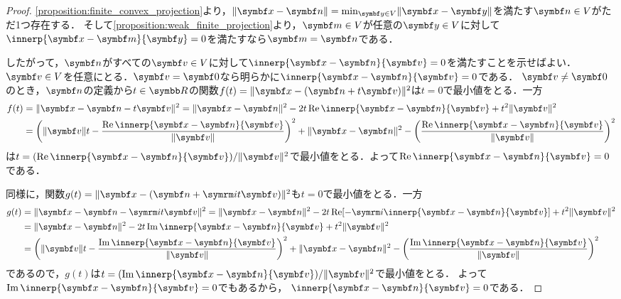 \documentclass[../../main]{subfiles}
\begin{document}
\begin{proof}
  \cref{proposition:finite_convex_projection}より，\(\vnorm{\vect{x}-\vect{n}}=\min_{\vect{y}\in V}\vnorm{\vect{x}-\vect{y}}\)を満たす\(\vect{n}\in V\)がただ1つ存在する．
  そして\cref{proposition:weak_finite_projection}より，\(\vect{m}\in V\)が任意の\(\vect{y}\in V\)に対して\(\innerp{\vect{x}-\vect{m}}{\vect{y}}=0\)を満たすなら\(\vect{m}=\vect{n}\)である．

  したがって，\(\vect{n}\)がすべての\(\vect{v}\in V\)に対して\(\innerp{\vect{x}-\vect{n}}{\vect{v}}=0\)を満たすことを示せばよい．
  \(\vect{v}\in V\)を任意にとる．\(\vect{v}=\vect{0}\)なら明らかに\(\innerp{\vect{x}-\vect{n}}{\vect{v}}=0\)である．
  \(\vect{v}\neq\vect{0}\)のとき，\(\vect{n}\)の定義から\(t\in\numset{R}\)の関数\(f(t)=\vnorm{\vect{x}-(\vect{n}+t\vect{v})}^2\)は\(t=0\)で最小値をとる．一方
  \begin{align*}
    f(t) &= \vnorm{\vect{x}-\vect{n}-t\vect{v}}^2 = \vnorm{\vect{x}-\vect{n}}^2-2t\rpart\innerp{\vect{x}-\vect{n}}{\vect{v}}+t^2\vnorm{\vect{v}}^2 \\
    &= \pqty*{\vnorm{\vect{v}}t-\frac{\rpart\innerp{\vect{x}-\vect{n}}{\vect{v}}}{\vnorm{\vect{v}}}}^2+\vnorm{\vect{x}-\vect{n}}^2-\pqty*{\frac{\rpart\innerp{\vect{x}-\vect{n}}{\vect{v}}}{\vnorm{\vect{v}}}}^2
  \end{align*}
  は\(t=(\rpart\innerp{\vect{x}-\vect{n}}{\vect{v}})/\vnorm{\vect{v}}^2\)で最小値をとる．よって\(\rpart\innerp{\vect{x}-\vect{n}}{\vect{v}}=0\)である．

  同様に，関数\(g(t)=\vnorm{\vect{x}-(\vect{n}+\iuni t\vect{v})}^2\)も\(t=0\)で最小値をとる．一方
  \begin{align*}
    g(t) &= \vnorm{\vect{x}-\vect{n}-\iuni t\vect{v}}^2 = \vnorm{\vect{x}-\vect{n}}^2-2t\rpart[-\iuni\innerp{\vect{x}-\vect{n}}{\vect{v}}]+t^2\vnorm{\vect{v}}^2 \\
    &= \vnorm{\vect{x}-\vect{n}}^2-2t\ipart\innerp{\vect{x}-\vect{n}}{\vect{v}}+t^2\vnorm{\vect{v}}^2 \\
    &= \pqty*{\vnorm{\vect{v}}t-\frac{\ipart\innerp{\vect{x}-\vect{n}}{\vect{v}}}{\vnorm{\vect{v}}}}^2+\vnorm{\vect{x}-\vect{n}}^2-\pqty*{\frac{\ipart\innerp{\vect{x}-\vect{n}}{\vect{v}}}{\vnorm{\vect{v}}}}^2
  \end{align*}
  であるので，\(g(t)\)は\(t=(\ipart\innerp{\vect{x}-\vect{n}}{\vect{v}})/\vnorm{\vect{v}}^2\)で最小値をとる．
  よって\(\ipart\innerp{\vect{x}-\vect{n}}{\vect{v}}=0\)でもあるから，
  \(\innerp{\vect{x}-\vect{n}}{\vect{v}}=0\)である．
\end{proof}
\end{document}
